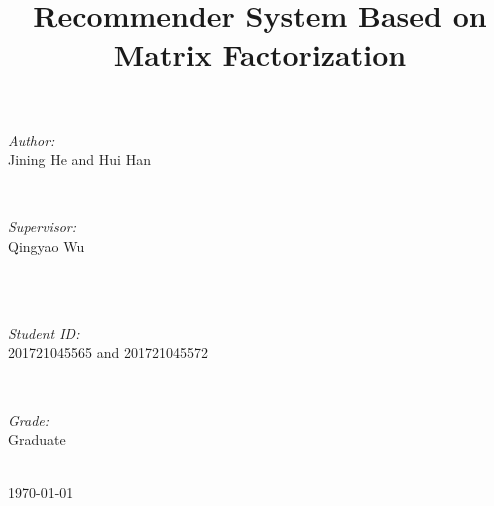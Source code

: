 \documentclass[journal, a4paper]{IEEEtran}
\begin{document}
\begin{titlepage}
\begin{minipage}{0.4\textwidth}
\begin{flushleft} \large
\emph{Author:}\\
Jining He and Hui Han %
\end{flushleft}
\end{minipage}
~
\begin{minipage}{0.4\textwidth}
\begin{flushright} \large
\emph{Supervisor:} \\
Qingyao Wu %
\end{flushright}
\end{minipage}\\[2cm]
~
\begin{minipage}{0.4\textwidth}
\begin{flushleft} \large
\emph{Student ID:}\\
201721045565 and 201721045572
\end{flushleft}
\end{minipage}
~
\begin{minipage}{0.4\textwidth}
\begin{flushright} \large
\emph{Grade:} \\
Graduate
\end{flushright}
\end{minipage}\\[2cm]



{\large \today}\\[2cm] %

 

\vfill %

\end{titlepage}

	\title{Recommender System Based on Matrix Factorization}
	\maketitle
\end{document}
